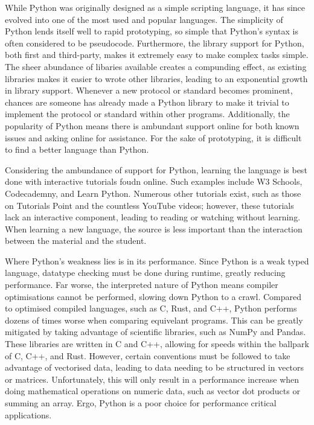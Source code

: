 \documentclass[11pt]{article}
\begin{document}
While Python was originally designed as a simple scripting language, it has since evolved into one of the most used and popular languages. The simplicity of Python lends itself well to rapid prototyping, so simple that Python's syntax is often considered to be pseudocode. Furthermore, the library support for Python, both first and third-party, makes it extremely easy to make complex tasks simple. The sheer abundance of libaries available creates a compunding effect, as existing libraries makes it easier to wrote other libraries, leading to an exponential growth in library support. Whenever a new protocol or standard becomes prominent, chances are someone has already made a Python library to make it trivial to implement the protocol or standard within other programs. Additionally, the popularity of Python means there is ambundant support online for both known issues and asking online for assistance. For the sake of prototyping, it is difficult to find a better language than Python.

Considering the ambundance of support for Python, learning the language is best done with interactive tutorials foudn online. Such examples include W3 Schools, Codecademny, and Learn Python. Numerous other tutorials exist, such as those on Tutorials Point and the countless YouTube videos; however, these tutorials lack an interactive component, leading to reading or watching without learning. When learning a new language, the source is less important than the interaction between the material and the student.

Where Python's weakness lies is in its performance. Since Python is a weak typed language, datatype checking must be done during runtime, greatly reducing performance. Far worse, the interpreted nature of Python means compiler optimisations cannot be performed, slowing down Python to a crawl. Compared to optimised compiled languages, such as C, Rust, and C++, Python performs dozens of times worse when comparing equivelant programs. This can be greatly mitigated by taking advantage of scientific libraries, such as NumPy and Pandas. These libraries are written in C and C++, allowing for speeds within the ballpark of C, C++, and Rust. However, certain conventions must be followed to take advantage of vectorised data, leading to data needing to be structured in vectors or matrices. Unfortunately, this will only result in a performance increase when doing mathematical operations on numeric data, such as vector dot products or summing an array. Ergo, Python is a poor choice for performance critical applications.
\end{document}

